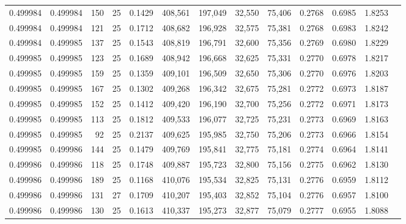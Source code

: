 \begin{tabular}{rrrrrrrrrrrrr}
0.499984 & 0.499984 &   150 &  25 &                                     0.1429 & 408,561 & 197,049 &  32,550 &  75,406 & 0.2768 & 0.6985 & 1.8253 \\
0.499984 & 0.499984 &   121 &  25 &                                     0.1712 & 408,682 & 196,928 &  32,575 &  75,381 & 0.2768 & 0.6983 & 1.8242 \\
0.499984 & 0.499985 &   137 &  25 &                                     0.1543 & 408,819 & 196,791 &  32,600 &  75,356 & 0.2769 & 0.6980 & 1.8229 \\
0.499985 & 0.499985 &   123 &  25 &                                     0.1689 & 408,942 & 196,668 &  32,625 &  75,331 & 0.2770 & 0.6978 & 1.8217 \\
0.499985 & 0.499985 &   159 &  25 &                                     0.1359 & 409,101 & 196,509 &  32,650 &  75,306 & 0.2770 & 0.6976 & 1.8203 \\
0.499985 & 0.499985 &   167 &  25 &                                     0.1302 & 409,268 & 196,342 &  32,675 &  75,281 & 0.2772 & 0.6973 & 1.8187 \\
0.499985 & 0.499985 &   152 &  25 &                                     0.1412 & 409,420 & 196,190 &  32,700 &  75,256 & 0.2772 & 0.6971 & 1.8173 \\
0.499985 & 0.499985 &   113 &  25 &                                     0.1812 & 409,533 & 196,077 &  32,725 &  75,231 & 0.2773 & 0.6969 & 1.8163 \\
0.499985 & 0.499985 &    92 &  25 &                                     0.2137 & 409,625 & 195,985 &  32,750 &  75,206 & 0.2773 & 0.6966 & 1.8154 \\
0.499985 & 0.499986 &   144 &  25 &                                     0.1479 & 409,769 & 195,841 &  32,775 &  75,181 & 0.2774 & 0.6964 & 1.8141 \\
0.499986 & 0.499986 &   118 &  25 &                                     0.1748 & 409,887 & 195,723 &  32,800 &  75,156 & 0.2775 & 0.6962 & 1.8130 \\
0.499986 & 0.499986 &   189 &  25 &                                     0.1168 & 410,076 & 195,534 &  32,825 &  75,131 & 0.2776 & 0.6959 & 1.8112 \\
0.499986 & 0.499986 &   131 &  27 &                                     0.1709 & 410,207 & 195,403 &  32,852 &  75,104 & 0.2776 & 0.6957 & 1.8100 \\
0.499986 & 0.499986 &   130 &  25 &                                     0.1613 & 410,337 & 195,273 &  32,877 &  75,079 & 0.2777 & 0.6955 & 1.8088 \\

\end{tabular}
